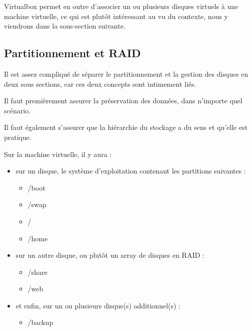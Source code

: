 \documentclass{article}
\begin{document}
Virtualbox permet en outre d'associer un ou plusieurs disques virtuels à une machine virtuelle, ce qui est plutôt intéressant au vu du contexte, nous y viendrons dans la sous-section suivante.	
	
\subsection{Partitionnement et RAID}

Il est assez compliqué de séparer le partitionnement et la gestion des disques en deux sous sections, car ces deux concepts sont intimement liés.

Il faut premièrement assurer la préservation des données, dans n'importe quel scénario. 

Il faut également s'assurer que la hiérarchie du stockage a du sens et qu'elle est pratique. 

Sur la machine virtuelle, il y aura :

\begin{itemize}
\item sur un disque, le système d'exploitation contenant les partitions suivantes :
\begin{itemize}
\item /boot
\item /swap
\item /
\item /home
\end{itemize}
\item sur un autre disque, ou plutôt un array de disques en RAID :
\begin{itemize}
\item /share
\item /web
\end{itemize}
\item et enfin, sur un ou plusieurs disque(s) additionnel(s) :
\begin{itemize}
\item /backup
\end{itemize}
\end{itemize}
	
\end{document}
